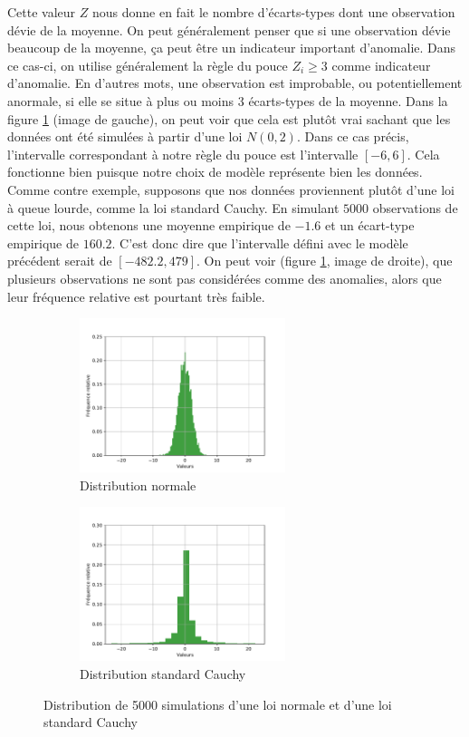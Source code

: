 Cette valeur $Z$ nous donne en fait le nombre d'écarts-types dont une observation dévie de la moyenne. On peut généralement penser que si une observation dévie beaucoup de la moyenne, ça peut être un indicateur important d'anomalie. Dans ce cas-ci, on utilise généralement la règle du pouce $Z_i \ge 3$ comme indicateur d'anomalie. En d'autres mots, une observation est improbable, ou potentiellement anormale, si elle se situe à plus ou moins 3 écarts-types de la moyenne. Dans la figure \ref{fig:ZTest} (image de gauche), on peut voir que cela est plutôt vrai sachant que les données ont été simulées à partir d'une loi $N(0, 2)$. Dans ce cas précis, l'intervalle correspondant à notre règle du pouce est l'intervalle $[-6, 6]$. Cela fonctionne bien puisque notre choix de modèle représente bien les données. Comme contre exemple, supposons que nos données proviennent plutôt d'une loi à queue lourde, comme la loi standard Cauchy. En simulant $5000$ observations de cette loi, nous obtenons une moyenne empirique de $-1.6$ et un écart-type empirique de $160.2$. C'est donc dire que l'intervalle défini avec le modèle précédent serait de $[-482.2, 479]$. On peut voir (figure \ref{fig:ZTest}, image de droite), que plusieurs observations ne sont pas considérées comme des anomalies, alors que leur fréquence relative est pourtant très faible.


\begin{figure}[htb]
	\centering
	\begin{subfigure}{6cm}
		\centering\includegraphics[width=6cm]{images/histogram-normal-ztest}
		\caption{Distribution normale}
	\end{subfigure}
	\begin{subfigure}{6cm}
		\centering\includegraphics[width=6cm]{images/histogram-cauchy-ztest}
		\caption{Distribution standard Cauchy}
	\end{subfigure}
	\caption{Distribution de 5000 simulations d'une loi normale et d'une loi standard Cauchy}
	\label{fig:ZTest}
\end{figure}

